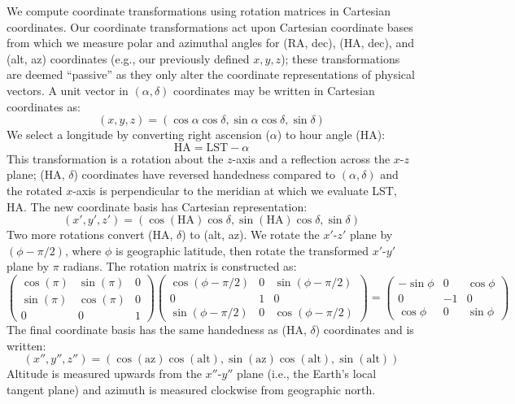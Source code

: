 \documentclass[10pt]{article}
\begin{document}
We compute coordinate transformations using rotation matrices in Cartesian coordinates.
Our coordinate transformations act upon Cartesian coordinate bases from which we measure polar and azimuthal angles for (RA, dec), (HA, dec), and (alt, az) coordinates (e.g., our previously defined $x,y,z$); these transformations are deemed ``passive'' as they only alter the coordinate representations of physical vectors.
A unit vector in $(\alpha, \delta)$ coordinates may be written in Cartesian coordinates as:
\[
	(x, y, z) = (\cos\alpha\cos\delta, \sin\alpha\cos\delta, \sin\delta)
\]
We select a longitude by converting right ascension ($\alpha$) to hour angle (HA):
\[
	\mathrm{HA} = \mathrm{LST} - \alpha
\]
This transformation is a rotation about the $z$-axis and a reflection across the $x$-$z$ plane; (HA, $\delta$) coordinates have reversed handedness compared to $(\alpha, \delta)$ and the rotated $x$-axis is perpendicular to the meridian at which we evaluate LST, HA.
The new coordinate basis has Cartesian representation:
\[
	(x', y', z') = (\cos(\mathrm{HA})\cos\delta, \sin(\mathrm{HA})\cos\delta, \sin\delta)
\]
Two more rotations convert (HA, $\delta$) to (alt, az).
We rotate the $x'$-$z'$ plane by $(\phi - \pi /2)$, where $\phi$ is geographic latitude, then rotate the transformed $x'$-$y'$ plane by $\pi$ radians.
The rotation matrix is constructed as:
\[
	\begin{pmatrix}
		\cos(\pi) & \sin(\pi) & 0 \\
		\sin(\pi) & \cos(\pi) & 0 \\
		0 & 0 & 1
	\end{pmatrix}
	\begin{pmatrix}
		\cos\left(\phi-\pi/2\right) & 0 & \sin\left(\phi-\pi/2\right) \\
		0 & 1 & 0 \\
		\sin\left(\phi-\pi/2\right) & 0 & \cos\left(\phi-\pi/2\right)
	\end{pmatrix}
	=
	\begin{pmatrix}
		-\sin\phi & 0 & \cos\phi \\
		0 & -1 & 0 \\
		\cos\phi & 0 & \sin\phi
	\end{pmatrix}
\]
The final coordinate basis has the same handedness as (HA, $\delta$) coordinates and is written:
\[
	(x'', y'', z'') = (\cos(\mathrm{az})\cos(\mathrm{alt}),
					   \sin(\mathrm{az})\cos(\mathrm{alt}),
					   \sin(\mathrm{alt}))
\]
Altitude is measured upwards from the $x''$-$y''$ plane (i.e., the Earth's local tangent plane) and azimuth is measured clockwise from geographic north.
\end{document}
